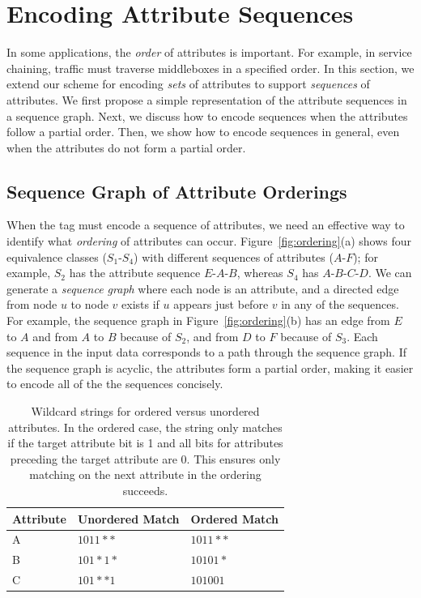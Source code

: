 \section{Encoding Attribute Sequences}
\label{sec:ordering}
In some applications, the \emph{order} of attributes is important.  For example, in service chaining, traffic must traverse middleboxes in a specified order.  In this section, we extend our scheme for encoding \emph{sets} of attributes to support \textit{sequences} of attributes.  We first propose a simple representation of the attribute sequences in a sequence graph.  Next, we discuss how to encode sequences when the attributes follow a partial order.  Then, we show how to encode sequences in general, even when the attributes do not form a partial order.

\subsection{Sequence Graph of Attribute Orderings}
When the tag must encode a sequence of attributes, we need an effective way to identify what \emph{ordering} of attributes can occur.  Figure~\ref{fig:ordering}(a) shows four equivalence classes ($S_1$-$S_4$) with different sequences of attributes ($A$-$F$); for example, $S_2$ has the attribute sequence $E$-$A$-$B$, whereas $S_4$ has $A$-$B$-$C$-$D$.  We can generate a \emph{sequence graph} where each node is an attribute, and a directed edge from node $u$ to node $v$ exists if $u$ appears just before $v$ in any of the sequences.  For example, the sequence graph in Figure~\ref{fig:ordering}(b) has an edge from $E$ to $A$ and from $A$ to $B$ because of $S_2$, and from $D$ to $F$ because of $S_3$.  Each sequence in the input data corresponds to a path through the sequence graph.  If the sequence graph is acyclic, the attributes form a partial order, making it easier to encode all of the the sequences concisely.

\begin{table}
    \begin{tabular}{| l | l | l |}
    \hline
    Attribute & Unordered Match & Ordered Match\\ \hline
    A & $1011**$ & $1011**$ \\ \hline
    B & $101*1*$ & $10101*$ \\ \hline
    C & $101**1$ & $101001$ \\
    \hline
    \end{tabular}
    \caption{Wildcard strings for ordered versus unordered attributes. %
     In the ordered case, the string only matches if the target attribute bit is 1 and all bits for attributes preceding the target attribute are 0. This ensures only matching on the next attribute in the ordering succeeds.} 
    \label{tab:ordering}
\end{table}

